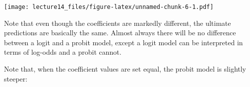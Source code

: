 \documentclass[
]{article}
\newenvironment{Shaded}{\begin{snugshade}}{\end{snugshade}}
\newcommand{\AttributeTok}[1]{\textcolor[rgb]{0.77,0.63,0.00}{#1}}
\newcommand{\FunctionTok}[1]{\textcolor[rgb]{0.00,0.00,0.00}{#1}}
\newcommand{\NormalTok}[1]{#1}
\newcommand{\SpecialCharTok}[1]{\textcolor[rgb]{0.00,0.00,0.00}{#1}}
\newcommand{\StringTok}[1]{\textcolor[rgb]{0.31,0.60,0.02}{#1}}
\begin{document}
\begin{Shaded}
\end{Shaded}

\texttt{[image: lecture14\_files/figure-latex/unnamed-chunk-6-1.pdf]}

Note that even though the coefficients are markedly different, the
ultimate predictions are basically the same. Almost always there will be
no difference between a logit and a probit model, except a logit model
can be interpreted in terms of log-odds and a probit cannot.

Note that, when the coefficient values are set equal, the probit model
is slightly steeper:
\end{document}
